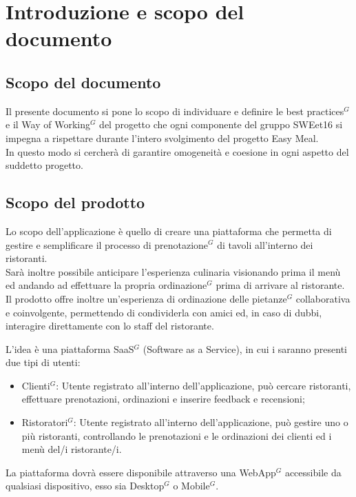 \section{Introduzione e scopo del documento}

    \subsection{Scopo del documento}

    Il presente documento si pone lo scopo di individuare e definire le best practices$^{G}$ e il Way of Working$^{G}$ del progetto che ogni componente del gruppo SWEet16
    si impegna a rispettare durante l’intero svolgimento del progetto Easy Meal. \\
    In questo modo si cercherà di garantire omogeneità e coesione in ogni aspetto del suddetto progetto.

    \subsection{Scopo del prodotto}

    Lo scopo dell’applicazione è quello di creare una piattaforma che permetta di gestire e semplificare il processo di prenotazione$^{G}$ di tavoli all’interno dei ristoranti. \\
    Sarà inoltre possibile anticipare l’esperienza culinaria visionando prima il menù ed andando ad effettuare la propria ordinazione$^{G}$ prima di arrivare al ristorante. \\
    Il prodotto offre inoltre un’esperienza di ordinazione delle pietanze$^{G}$ collaborativa e coinvolgente, permettendo di condividerla con amici ed, in caso di dubbi, interagire direttamente con lo staff del ristorante.

    L’idea è una piattaforma SaaS$^{G}$ (Software as a Service), in cui i saranno presenti due tipi di utenti:
    \begin{itemize}
        \item Clienti$^{G}$: Utente registrato all’interno dell’applicazione, può cercare ristoranti, effettuare prenotazioni, ordinazioni e inserire feedback e recensioni;
        \item Ristoratori$^{G}$: Utente registrato all’interno dell’applicazione, può gestire uno o più ristoranti, controllando le prenotazioni e le ordinazioni dei clienti ed i menù del/i ristorante/i.
    \end{itemize}


    La piattaforma dovrà essere disponibile attraverso una WebApp$^{G}$ accessibile da qualsiasi dispositivo, esso sia Desktop$^{G}$ o Mobile$^{G}$.


